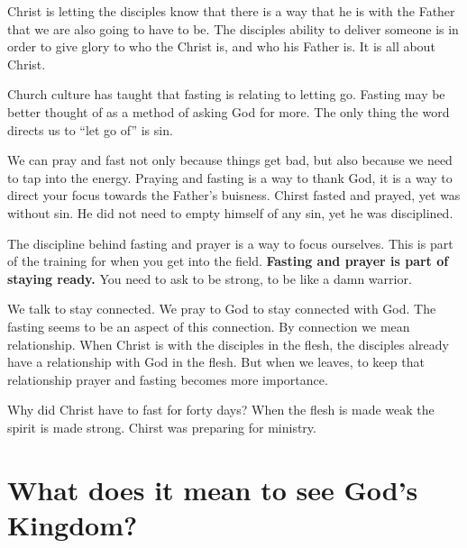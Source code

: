 \documentclass[12pt]{article}
\begin{document}
	Christ is letting the disciples know that there is a way that
	he is with the Father that we are also going to have to be.
	The disciples ability to deliver someone is in order to give
	glory to who the Christ is, and who his Father is. It is all
	about Christ.

	Church culture has taught that fasting is relating to letting go.
	Fasting may be better thought of as a method of asking God for
	more. The only thing the word directs us to ``let go of'' is 
	sin.

	\begin{quote}
		\BiblePsalmFiftyOneSeventeen{}
	\end{quote}

	\begin{quote}
		\BibleIsaiahFiftySevenFifteen{}
	\end{quote}

	\begin{quote}
		\BibleIsaiahSixtySixTwo{}
	\end{quote}

	We can pray and fast not only because things get bad, but
	also because we need to tap into the energy. Praying and fasting
	is a way to thank God, it is a way to direct your focus towards
	the Father's buisness. Chirst fasted and prayed, yet was
	without sin. He did not need to empty himself of any sin, yet
	he was disciplined.

	The discipline behind fasting and prayer is a way to focus
	ourselves. This is part of the training for when you get into
	the field. \textbf{Fasting and prayer is part of staying ready.}
	You need to ask to be strong, to be like a damn warrior.

	We talk to stay connected. We pray to God to stay connected with
	God. The fasting seems to be an aspect of this connection. By
	connection we mean relationship. When Christ is with the disciples
	in the flesh, the disciples already have a relationship with God
	in the flesh. But when we leaves, to keep that relationship prayer
	and fasting becomes more importance.

	Why did Christ have to fast for forty days? When the flesh is 
	made weak the spirit is made strong. Chirst was preparing for 
	ministry.

	\section*{\normalsize What does it mean to see God's Kingdom?}
\end{document}
